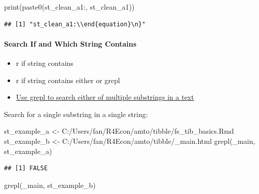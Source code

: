 \documentclass[
]{book}
\newenvironment{Shaded}{\begin{snugshade}}{\end{snugshade}}
\newcommand{\FunctionTok}[1]{\textcolor[rgb]{0.00,0.00,0.00}{#1}}
\newcommand{\NormalTok}[1]{#1}
\newcommand{\OtherTok}[1]{\textcolor[rgb]{0.56,0.35,0.01}{#1}}
\newcommand{\StringTok}[1]{\textcolor[rgb]{0.31,0.60,0.02}{#1}}
\providecommand{\tightlist}{%
  \setlength{\itemsep}{0pt}\setlength{\parskip}{0pt}}
\begin{document}
\begin{Shaded}
\begin{Highlighting}[]
\FunctionTok{print}\NormalTok{(}\FunctionTok{paste0}\NormalTok{(}\StringTok{\textquotesingle{}st\_clean\_a1:\textquotesingle{}}\NormalTok{, st\_clean\_a1))}
\end{Highlighting}
\end{Shaded}

\begin{verbatim}
## [1] "st_clean_a1:\\end{equation}\n}"
\end{verbatim}

\hypertarget{search-if-and-which-string-contains}{%
\paragraph{Search If and Which String Contains}\label{search-if-and-which-string-contains}}

\begin{itemize}
\tightlist
\item
  r if string contains
\item
  r if string contains either or grepl
\item
  \href{https://stackoverflow.com/a/26319765/8280804}{Use grepl to search either of multiple substrings in a text}
\end{itemize}

Search for a single substring in a single string:

\begin{Shaded}
\begin{Highlighting}[]
\NormalTok{st\_example\_a }\OtherTok{\textless{}{-}} \StringTok{\textquotesingle{}C:/Users/fan/R4Econ/amto/tibble/fs\_tib\_basics.Rmd\textquotesingle{}}
\NormalTok{st\_example\_b }\OtherTok{\textless{}{-}} \StringTok{\textquotesingle{}C:/Users/fan/R4Econ/amto/tibble/\_main.html\textquotesingle{}}
\FunctionTok{grepl}\NormalTok{(}\StringTok{\textquotesingle{}\_main\textquotesingle{}}\NormalTok{, st\_example\_a)}
\end{Highlighting}
\end{Shaded}

\begin{verbatim}
## [1] FALSE
\end{verbatim}

\begin{Shaded}
\begin{Highlighting}[]
\FunctionTok{grepl}\NormalTok{(}\StringTok{\textquotesingle{}\_main\textquotesingle{}}\NormalTok{, st\_example\_b)}
\end{Highlighting}
\end{Shaded}
\end{document}
